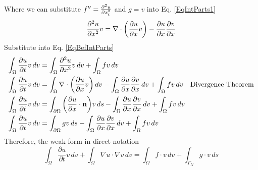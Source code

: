 \documentclass[12pt,3p]{article}
\begin{document}
Where we can substitute $f'' = \pdv[2]{u}{x_i} $ and $g = v$ into Eq. \ref{EqIntParts1}
\begin{equation*}
\pdv[2]{u}{x} v = \nabla \cdot \bigg( \pdv{u}{x} v \bigg) - \pdv{u}{x} \pdv{v}{x}
\end{equation*}
Substitute into Eq. \ref{EqBefIntParts}
\begin{align*}
\int_{\Omega} \frac{\partial u}{\partial t} v \, dv
	&= \int_{\Omega} \pdv[2]{u}{x} v \, dv + \int_{\Omega} f v \, dv \\
\int_{\Omega} \frac{\partial u}{\partial t} v \, dv 
	&= \int_{\Omega} \nabla \cdot \bigg( \pdv{u}{x} v \bigg) \, dv - \int_{\Omega} \pdv{u}{x} \pdv{v}{x} \, dv
	  + \int_{\Omega} f v \, dv \quad \text{Divergence Theorem} \\
\int_{\Omega} \frac{\partial u}{\partial t} v \, dv
	&= \int_{\partial \Omega} \bigg( \pdv{u}{x} \cdot \mathbf{n} \bigg) v \, ds 
	- \int_{\Omega} \pdv{u}{x} \pdv{v}{x} \, dv + \int_{\Omega} f v \, dv \\
\int_{\Omega} \frac{\partial u}{\partial t} v \, dv 
	&= \int_{\partial \Omega} g v \, ds - \int_{\Omega} \pdv{u}{x} \pdv{v}{x} \, dv + \int_{\Omega} f v \, dv
\end{align*}
Therefore, the weak form in  direct notation
\begin{equation}\label{EqWeakForm}
\int_{\Omega} \frac{\partial u}{\partial t} v \, dv + \int_{\Omega} \nabla u \cdot \nabla v \, dv
	= \int_{\Omega} f \cdot v \, dv + \int_{\Gamma_N} g \cdot v \, ds 
\end{equation}

\end{document}
